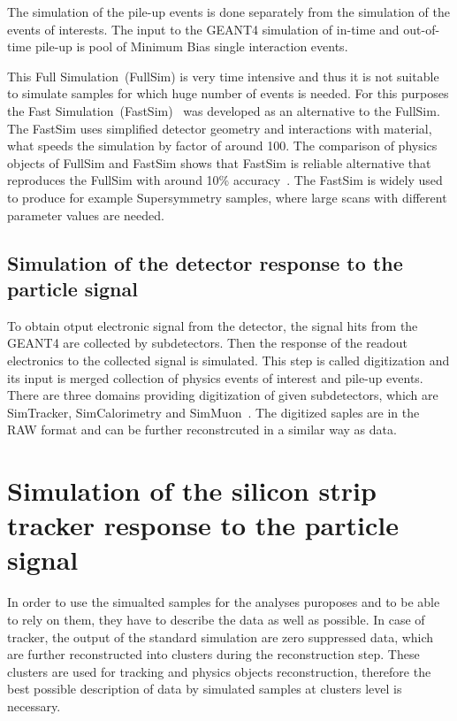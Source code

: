The simulation of the pile-up events is done separately from the simulation of the events of interests. The input to the GEANT4 simulation of in-time and out-of-time pile-up is pool of Minimum Bias single interaction events.


This Full Simulation~(FullSim) is very time intensive and thus it is not suitable to simulate samples for which huge number of events is needed. For this purposes the Fast Simulation~(FastSim)~\cite{Sekmen:2017hzs, CMS:2010spa, Giammanco:2014bza} was developed as an alternative to the FullSim. The FastSim uses simplified detector geometry and interactions with material, what speeds the simulation by factor of around 100. The comparison of physics objects of FullSim and FastSim shows that FastSim is reliable alternative that reproduces the FullSim with around 10\% accuracy~\cite{Abdullin:2011zz, Sekmen:2017hzs}. The FastSim is widely used to produce for example Supersymmetry samples, where large scans with different parameter values are needed.

\subsection{Simulation of the detector response to the particle signal}

To obtain otput electronic signal from the detector, the signal hits from the GEANT4 are collected by subdetectors. Then the response of the readout electronics to the collected signal is simulated. This step is called digitization and its input is merged collection of physics events of interest and pile-up events. There are three domains providing digitization of given subdetectors, which are SimTracker, SimCalorimetry and SimMuon~\cite{website:simdigi}. The digitized saples are in the RAW format and can be further reconstrcuted in a similar way as data.

\newpage

\section{Simulation of the silicon strip tracker response to the particle signal}

In order to use the simualted samples for the analyses puroposes and to be able to rely on them, they have to describe the data as well as possible. In case of tracker, the output of the standard simulation are zero suppressed data, which are further reconstructed into clusters during the reconstruction step. These clusters are used for tracking and physics objects reconstruction, therefore the best possible description of data by simulated samples at clusters level is necessary.

